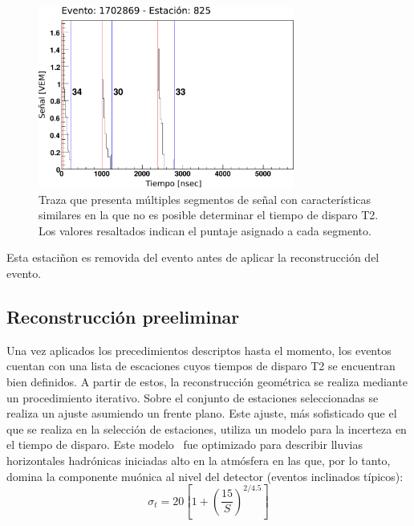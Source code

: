 		\begin{figure}[ht]
			\begin{center}
			\includegraphics[width=0.75\textwidth]{fig/seleccionAuger/multipicos.pdf}
			\caption{Traza que presenta múltiples segmentos de señal con características similares en la que no es posible determinar el tiempo de disparo T2. Los valores resaltados indican el puntaje asignado a cada segmento.}
			\label{fig:multipicos}
			\end{center}
		\end{figure}
		Esta estaciñon es removida del evento antes de aplicar la reconstrucción del evento.
		
	\subsection{Reconstrucción preeliminar}
	
	Una vez aplicados los precedimientos descriptos hasta el momento, los eventos cuentan con una lista de escaciones cuyos tiempos de disparo T2 se encuentran bien definidos.
	A partir de estos, la reconstrucción geométrica se realiza mediante un procedimiento iterativo.
	Sobre el conjunto de estaciones seleccionadas se realiza un ajuste asumiendo un frente plano.
	Este ajuste, más sofisticado que el que se realiza en la selección de estaciones, utiliza un modelo para la incerteza en el tiempo de disparo.
	Este modelo~\cite{cite:ines} fue optimizado para describir lluvias horizontales hadrónicas iniciadas alto en la atmósfera en las que, por lo tanto, domina la componente muónica al nivel del detector (eventos inclinados típicos):
	\begin{equation}
	\sigma_t = 20 \left[ 1 + \left( \frac{15}{S} \right)^{2/4.5} \right]
	\label{ec:varT} 
	\end{equation}

